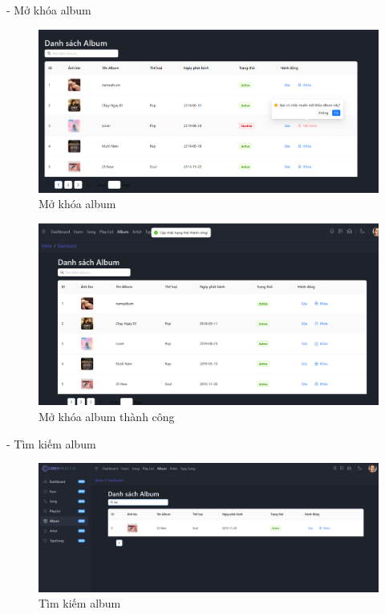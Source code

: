 - Mở khóa album
\begin{figure}[H]
    \centering
    \includegraphics[width=1\textwidth]{imgs/chap5/ql_album_8.png}
    \caption{Mở khóa album}
\end{figure}
\begin{figure}[H]
    \centering
    \includegraphics[width=1\textwidth]{imgs/chap5/ql_album_9.png}
    \caption{Mở khóa album thành công}
\end{figure}

- Tìm kiếm album
\begin{figure}[H]
    \centering
    \includegraphics[width=1\textwidth]{imgs/chap5/ql_album_7.png}
    \caption{Tìm kiếm album}
\end{figure}


